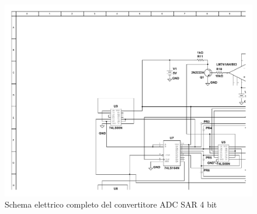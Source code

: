 \documentclass[journal]{IEEEtran}
\begin{document}
\begin{figure}[t]%
\centering
\begin{center}
\includegraphics[width=1.15\textwidth, angle=90]{sch-simulations/digital/output/SAR_4bit_cv1.pdf}
\end{center}
\caption{Schema elettrico completo del convertitore ADC SAR 4 bit}
\label{fig:circuit_sarCompleteSchematic}
\end{figure}



\end{document}
